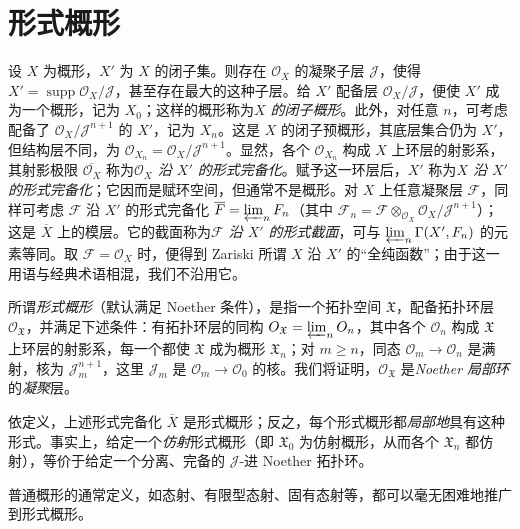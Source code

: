 \chapter{形式概形}\thispagestyle{fancy}\label{fga2-2}
\par{}设 \(X\) 为概形，\(X'\) 为 \(X\) 的闭子集。则存在 \(\mathcal {O}_X\) 的凝聚子层 \(\mathscr {J}\)，使得 \(X'=\operatorname {supp}\mathcal {O}_X/\mathscr {J}\)，甚至存在最大的这种子层。给 \(X'\) 配备层 \(\mathcal {O}_X/\mathscr {J}\)，便使 \(X'\) 成为一个概形，记为 \(X_0\)；这样的概形称为\emph{\(X\) 的闭子概形}。此外，对任意 \(n\)，可考虑配备了 \(\mathcal {O}_X/\mathscr {J}^{n+1}\) 的 \(X'\)，记为 \(X_n\)。这是 \(X\) 的闭子预概形，其底层集合仍为 \(X'\)，但结构层不同，为 \(\mathcal {O}_{X_n}=\mathcal {O}_X/\mathscr {J}^{n+1}\)。显然，各个 \(\mathcal {O}_{X_n}\) 构成 \(X\) 上环层的射影系，其射影极限 \(\overline {\mathcal {O}_X}\) 称为\emph{\(\mathcal {O}_X\) 沿 \(X'\) 的形式完备化}。赋予这一环层后，\(X'\) 称为\emph{\(X\) 沿 \(X'\) 的形式完备化}；它因而是赋环空间，但通常不是概形。对 \(X\) 上任意凝聚层 \(\mathscr {F}\)，同样可考虑 \(\mathscr {F}\) 沿 \(X'\) 的形式完备化 \(\overline {\mathscr {F}}=\varprojlim _n\mathscr {F}_n\)（其中 \(\mathscr {F}_n=\mathscr {F}\otimes _{\mathcal {O}_X}\mathcal {O}_X/\mathscr {J}^{n+1}\)）；这是 \(\overline {X}\) 上的模层。它的截面称为\emph{\(\mathscr {F}\) 沿 \(X'\) 的形式截面}，可与 \(\varprojlim _n\Gamma (X',\mathscr {F}_n)\) 的元素等同。取 \(\mathscr {F}=\mathcal {O}_X\) 时，便得到 Zariski 所谓 \(X\) 沿 \(X'\) 的“全纯函数”；由于这一用语与经典术语相混，我们不沿用它。
\par{}所谓\emph{形式概形}（默认满足 Noether 条件），是指一个拓扑空间 \(\mathfrak {X}\)，配备拓扑环层 \(\mathcal {O}_{\mathfrak {X}}\)，并满足下述条件：有拓扑环层的同构 \(\mathcal {O}_{\mathfrak {X}}=\varprojlim _n\mathcal {O}_n\)，其中各个 \(\mathcal {O}_n\) 构成 \(\mathfrak {X}\) 上环层的射影系，每一个都使 \(\mathfrak {X}\) 成为概形 \(\mathfrak {X}_n\)；对 \(m\geqslant  n\)，同态 \(\mathcal {O}_m\to \mathcal {O}_n\) 是满射，核为 \(\mathscr {J}_m^{n+1}\)，这里 \(\mathscr {J}_m\) 是 \(\mathcal {O}_m\to \mathcal {O}_0\) 的核。我们将证明，\(\mathcal {O}_{\mathfrak {X}}\) 是\emph{Noether 局部环}的\emph{凝聚}层。
\par{}依定义，上述形式完备化 \(\overline {X}\) 是形式概形；反之，每个形式概形都\emph{局部地}具有这种形式。事实上，给定一个\emph{仿射}形式概形（即 \(\mathfrak {X}_0\) 为仿射概形，从而各个 \(\mathfrak {X}_n\) 都仿射），等价于给定一个分离、完备的 \(\mathscr {J}\)-进 Noether 拓扑环。
\par{}普通概形的通常定义，如态射、有限型态射、固有态射等，都可以毫无困难地推广到形式概形。
